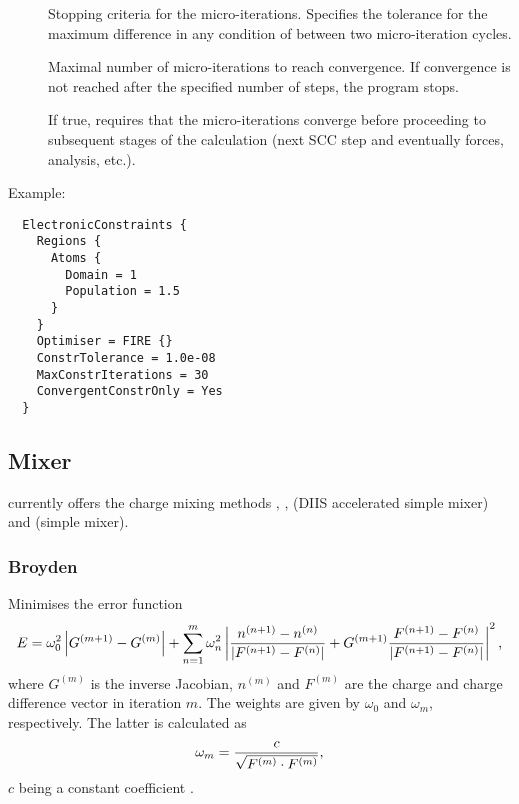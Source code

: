 \begin{description}
\item[] Stopping criteria for the micro-iterations.
  Specifies the tolerance for the maximum difference in any condition of
   between two micro-iteration cycles.

\item[] Maximal number of micro-iterations to reach
  convergence. If convergence is not reached after the specified
  number of steps, the program stops.

\item[] If true, requires that the micro-iterations
  converge before proceeding to subsequent stages of the calculation (next SCC
  step and eventually forces, analysis, etc.).
\end{description}

Example:
\begin{verbatim}
  ElectronicConstraints {
    Regions {
      Atoms {
        Domain = 1
        Population = 1.5
      }
    }
    Optimiser = FIRE {}
    ConstrTolerance = 1.0e-08
    MaxConstrIterations = 30
    ConvergentConstrOnly = Yes
  }
\end{verbatim}


\subsection{Mixer}
\label{sec:dftbp.Mixer}

{\dftbp} currently offers the charge mixing methods ,
,  (DIIS accel\-er\-ated simple mixer) and
 (simple mixer).

\subsubsection{Broyden\cb}
\label{sec:dftbp.Broyden}

Minimises the error function
\begin{equation*}
  E = \omega_0^2 \left| G^{(m+1)} - G^{(m)}\right| + \sum_{n=1}^m
  \omega_n^2 \left|
    \frac{n^{(n+1)} - n^{(n)}}{|F^{(n+1)}  - F^{(n)}|}
    + G^{(m+1)}
    \frac{F^{(n+1)}  - F^{(n)}}{|F^{(n+1)}  - F^{(n)}|} \right|^2
  \text,
\end{equation*}
where $G^{(m)}$ is the inverse Jacobian, $n^{(m)}$ and $F^{(m)}$ are
the charge and charge difference vector in iteration $m$. The weights
are given by $\omega_0$ and $\omega_m$, respectively. The latter is
calculated as
\begin{equation}
  \label{eq:omega_m}
  \omega_m = \frac{c}{\sqrt{F^{(m)}\cdot F^{(m)}}}
  \text,
\end{equation}
$c$ being a constant coefficient \cite{johnson-PRB-38-12807}.

